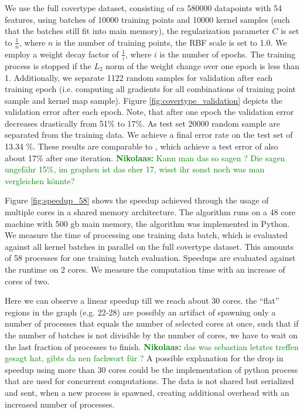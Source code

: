 \documentclass{article} %
\newcommand{\nikolaas}[1]{\textcolor{green}{{\bf Nikolaas:} #1}}
\begin{document}
We use the full covertype dataset, consisting of ca 580000 datapoints with 54 features, using batches of 10000 training points and 10000 kernel samples (such that the batches still fit into main memory), the regularization parameter $C$ is set to $\frac{1}{n}$, where $n$ is the number of training points, the RBF scale is set to 1.0. We employ a weight decay factor of $\frac{1}{i}$, where $i$ is the number of epochs. The training process is stopped if the $L_{2}$ norm of the weight change over one epoch is less than 1.
Additionally, we separate 1122 random samples for validation after each training epoch (i.e. computing all gradients for all combinations of training point sample and kernel map sample).
Figure \ref{fig:covertype_validation} depicts the validation error after each epoch.
Note, that after one epoch the validation error decreases drastically from 51\% to 17\%.
As test set 20000 random sample are separated from the training data. We achieve a final error rate on the test set of 13.34 \%. 
These results are comparable to \cite{Dai2014}, which achieve a test error of also about 17\% after one iteration. 
\nikolaas{Kann man das so sagen ? Die sagen ungefähr 15\%, im graphen ist das eher 17, wisst ihr sonst noch was man vergleichen könnte? }


Figure \ref{fig:speedup_58} shows the speedup achieved through the usage of multiple cores in a shared memory architecture.
The algorithm runs on a 48 core machine with 500 gb main memory, the algorithm was implemented in Python. We measure the time of processing one training data batch, which is evaluated against all kernel batches in parallel on the full covertype dataset. This amounts of 58 processes for one training batch evaluation. Speedups are evaluated against the runtime on 2 cores. We measure the computation time with an increase of cores of two.

Here we can observe a linear speedup till we reach about 30 cores. the ``flat'' regions in the graph (e.g. 22-28) are possibly an artifact of spawning only a number of processes that equals the number of selected cores at once, such that if the number of batches is not divisible by the number of cores, we have to wait on the last fraction of processes to finish. 
\nikolaas{das was sebastian letztes treffen gesagt hat, gibts da nen fachwort für ?}
A possible explanation for the drop in speedup using more than 30 cores could be the implementation of python process that are used for concurrent computations. The data is not shared but serialized and sent, when a new process is spawned, creating additional overhead with an increased number of processes.
\end{document}
